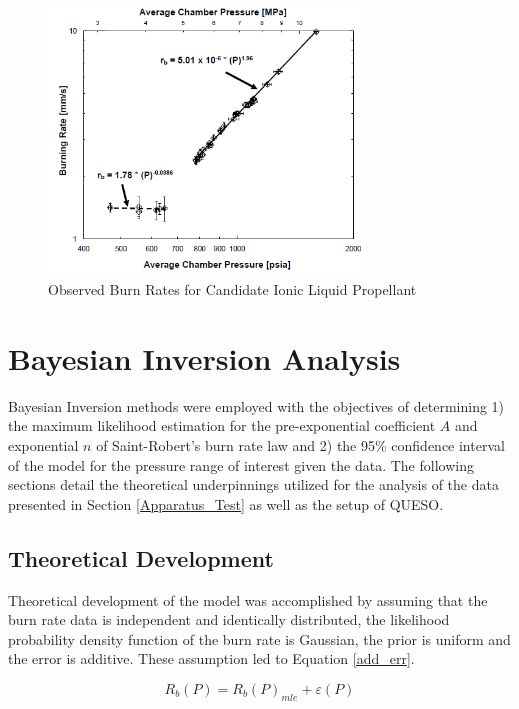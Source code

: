 \documentclass{article}
\begin{document}
\begin{figure}[htb]
\centering
\includegraphics[width=0.75\textwidth]{Experimentors_Obs_fit.png}
\caption{Observed Burn Rates for Candidate Ionic Liquid Propellant}
\label{fig3}
\end{figure}

\section{Bayesian Inversion Analysis} \label{Bayesian_Inv_Analysis}

Bayesian Inversion methods were employed with the objectives of determining 1) the maximum likelihood estimation for
the pre-exponential coefficient $A$ and exponential $n$ of Saint-Robert's burn rate law and 2) the 95\% confidence interval 
of the model for the pressure range of interest given the data. The following sections detail the theoretical 
underpinnings utilized for the analysis of the data presented in Section \ref{Apparatus_Test} as well as the setup of QUESO.

\subsection{Theoretical Development} \label{Theory_Dev}

Theoretical development of the model was accomplished by assuming that the burn rate data is independent and 
identically distributed, the likelihood probability density function of the burn rate is Gaussian, the prior 
is uniform and the error is additive. These assumption led to Equation \ref{add_err}. 

\begin{equation} \label{add_err}
R_b (P)=R_b (P)_{mle} + \varepsilon (P)
\end{equation}
\end{document}
